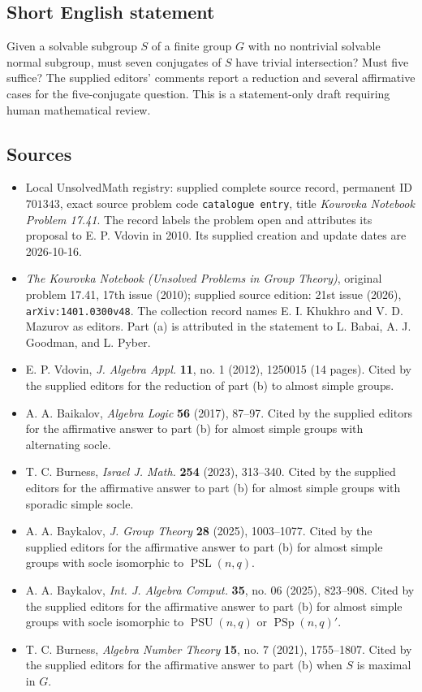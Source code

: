 \documentclass[11pt]{article}
\begin{document}
\subsection{Short English statement}
Given a solvable subgroup \(S\) of a finite group \(G\) with no nontrivial solvable normal subgroup, must seven conjugates of \(S\) have trivial intersection? Must five suffice? The supplied editors' comments report a reduction and several affirmative cases for the five-conjugate question. This is a statement-only draft requiring human mathematical review.
\subsection{Sources}
\begin{itemize}
\item Local UnsolvedMath registry: supplied complete source record, permanent ID \(701343\), exact source problem code \texttt{catalogue entry}, title \emph{Kourovka Notebook Problem 17.41}. The record labels the problem open and attributes its proposal to E. P. Vdovin in 2010. Its supplied creation and update dates are 2026-10-16.
\item \emph{The Kourovka Notebook (Unsolved Problems in Group Theory)}, original problem 17.41, 17th issue (2010); supplied source edition: 21st issue (2026), \texttt{arXiv:1401.0300v48}. The collection record names E. I. Khukhro and V. D. Mazurov as editors. Part (a) is attributed in the statement to L. Babai, A. J. Goodman, and L. Pyber.
\item E. P. Vdovin, \emph{J. Algebra Appl.} \textbf{11}, no. 1 (2012), 1250015 (14 pages). Cited by the supplied editors for the reduction of part (b) to almost simple groups.
\item A. A. Baikalov, \emph{Algebra Logic} \textbf{56} (2017), 87--97. Cited by the supplied editors for the affirmative answer to part (b) for almost simple groups with alternating socle.
\item T. C. Burness, \emph{Israel J. Math.} \textbf{254} (2023), 313--340. Cited by the supplied editors for the affirmative answer to part (b) for almost simple groups with sporadic simple socle.
\item A. A. Baykalov, \emph{J. Group Theory} \textbf{28} (2025), 1003--1077. Cited by the supplied editors for the affirmative answer to part (b) for almost simple groups with socle isomorphic to \(\operatorname{PSL}(n,q)\).
\item A. A. Baykalov, \emph{Int. J. Algebra Comput.} \textbf{35}, no. 06 (2025), 823--908. Cited by the supplied editors for the affirmative answer to part (b) for almost simple groups with socle isomorphic to \(\operatorname{PSU}(n,q)\) or \(\operatorname{PSp}(n,q)'\).
\item T. C. Burness, \emph{Algebra Number Theory} \textbf{15}, no. 7 (2021), 1755--1807. Cited by the supplied editors for the affirmative answer to part (b) when \(S\) is maximal in \(G\).
\end{itemize}
\end{document}
